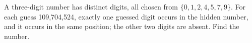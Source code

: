 A three-digit number has distinct digits, all chosen from $\{0,1,2,4,5,7,9\}$. For each guess 109,704,524, exactly one guessed digit occurs in the hidden number, and it occurs in the same position; the other two digits are absent. Find the number.
